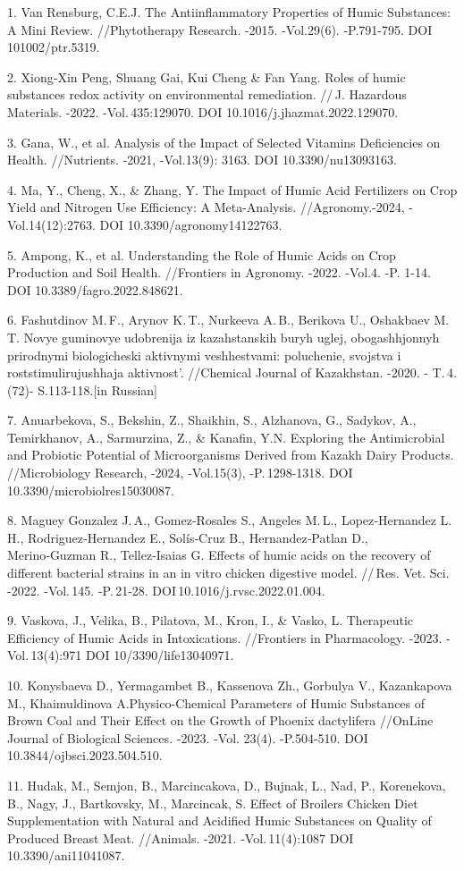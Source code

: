 \begin{refs}
1. Van Rensburg, C.E.J. The Antiinflammatory Properties of Humic
Substances: A Mini Review. //Phytotherapy Research. -2015. -Vol.29(6).
-P.791-795. DOI 101002/ptr.5319.

2. Xiong‑Xin Peng, Shuang Gai, Kui Cheng \& Fan Yang. Roles of humic
substances redox activity on environmental remediation. //\,J. Hazardous
Materials. -2022. -Vol.\,435:129070. DOI 10.1016/j.jhazmat.2022.129070.

3. Gana, W., et al. Analysis of the Impact of Selected Vitamins
Deficiencies on Health. //Nutrients. -2021, -Vol.13(9): 3163. DOI
10.3390/nu13093163.

4. Ma, Y., Cheng, X., \& Zhang, Y. The Impact of Humic Acid Fertilizers
on Crop Yield and Nitrogen Use Efficiency: A Meta-Analysis.
//Agronomy.-2024, -Vol.14(12):2763. DOI 10.3390/agronomy14122763.

5. Ampong, K., et al. Understanding the Role of Humic Acids on Crop
Production and Soil Health. //Frontiers in Agronomy. -2022. -Vol.4. -P.
1-14. DOI 10.3389/fagro.2022.848621.

6. Fashutdinov M.\,F., Arynov K.\,T., Nurkeeva A.\,B., Berikova U.,
Oshakbaev M.\,T. Novye guminovye udobrenija iz kazahstanskih buryh
uglej, obogashhjonnyh prirodnymi biologicheski aktivnymi veshhestvami:
poluchenie, svojstva i roststimulirujushhaja aktivnost'.
//Chemical Journal of Kazakhstan. -2020. - T.\,4.(72)- S.113-118.{[}in
Russian{]}

7. Anuarbekova, S., Bekshin, Z., Shaikhin, S., Alzhanova, G., Sadykov,
A., Temirkhanov, A., Sarmurzina, Z., \& Kanafin, Y.N. Exploring the
Antimicrobial and Probiotic Potential of Microorganisms Derived from
Kazakh Dairy Products. //Microbiology Research, -2024, -Vol.15(3),
-P.\,1298-1318. DOI 10.3390/microbiolres15030087.

8. Maguey Gonzalez J.\,A., Gomez‑Rosales S., Angeles M.\,L.,
Lopez‑Hernandez L.\,H., Rodriguez‑Hernandez E., Solís‑Cruz B.,
Hernandez‑Patlan D., Merino‑Guzman R., Tellez‑Isaias G. Effects of humic
acids on the recovery of different bacterial strains in an in vitro
chicken digestive model. //\,Res. Vet. Sci. -2022. -Vol.\,145.
-P.\,21-28. DOI\,10.1016/j.rvsc.2022.01.004.

9. Vaskova, J., Velika, B., Pilatova, M., Kron, I., \& Vasko, L.
Therapeutic Efficiency of Humic Acids in Intoxications. //Frontiers in
Pharmacology. -2023. -Vol.\,13(4):971 DOI 10/3390/life13040971.

10. Konysbaeva D., Yermagambet B., Kassenova Zh., Gorbulya V.,
Kazankapova M., Khaimuldinova A.Physico-Chemical Parameters of Humic
Substances of Brown Coal and Their Effect on the Growth of Phoenix
dactylifera //OnLine Journal of Biological Sciences\emph{.} -2023. -Vol.
23(4). -P.504-510. DOI 10.3844/ojbsci.2023.504.510.

11. Hudak, M., Semjon, B., Marcincakova, D., Bujnak, L., Nad, P.,
Korenekova, B., Nagy, J., Bartkovsky, M., Marcincak, S. Effect of
Broilers Chicken Diet Supplementation with Natural and Acidified Humic
Substances on Quality of Produced Breast Meat. //Animals. -2021.
-Vol.\,11(4):1087 DOI 10.3390/ani11041087.
\end{refs}

